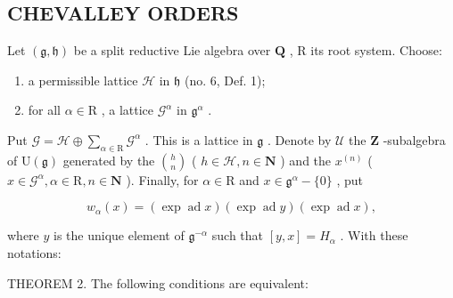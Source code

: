 \subsection{CHEVALLEY ORDERS}

Let \((\mathfrak{g},\mathfrak{h})\) be a split reductive Lie algebra over \(\mathbf{Q}\) , \(\mathrm{R}\) its root system. Choose:

\begin{enumerate}
\def\labelenumi{\alph{enumi})}
\item
  a permissible lattice \(\mathcal{H}\) in \(\mathfrak{h}\) (no. 6, Def. 1);
\item
  for all \(\alpha \in \mathrm{R}\) , a lattice \(\mathcal{G}^{\alpha}\) in \(\mathfrak{g}^{\alpha}\) .
\end{enumerate}

Put \(\mathcal{G} = \mathcal{H} \oplus \sum_{\alpha \in \mathrm{R}} \mathcal{G}^{\alpha}\) . This is a lattice in \(\mathfrak{g}\) . Denote by \(\mathcal{U}\) the \(\mathbf{Z}\) -subalgebra of \(\mathrm{U}(\mathfrak{g})\) generated by the \(\binom{h}{n}\) ( \(h \in \mathcal{H}, n \in \mathbf{N}\) ) and the \(x^{(n)}\) ( \(x \in \mathcal{G}^{\alpha}, \alpha \in \mathrm{R}, n \in \mathbf{N}\) ). Finally, for \(\alpha \in \mathrm{R}\) and \(x \in \mathfrak{g}^{\alpha} - \{0\}\) , put

\[
w _ {\alpha} (x) = (\exp \operatorname{ad} x) (\exp \operatorname{ad} y) (\exp \operatorname{ad} x),
\]

where \(y\) is the unique element of \(\mathfrak{g}^{-\alpha}\) such that \([y,x] = H_{\alpha}\) . With these notations:

THEOREM 2. The following conditions are equivalent:

